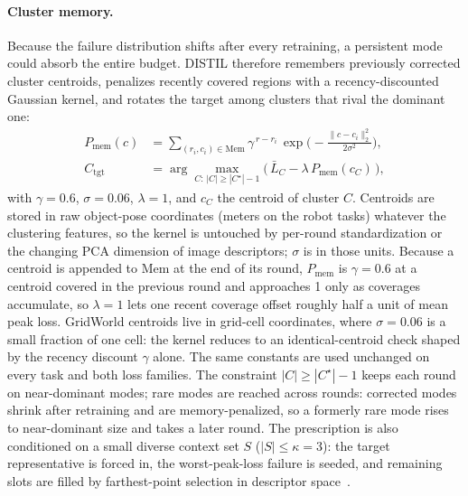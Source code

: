 \documentclass[letterpaper]{article} %
\begin{document}
\paragraph{Cluster memory.}
Because the failure distribution shifts after every retraining, a persistent
mode could absorb the entire budget. DISTIL therefore remembers previously
corrected cluster centroids, penalizes recently covered regions with a
recency-discounted Gaussian kernel, and rotates the target among clusters
that rival the dominant one:
\begin{align}
P_{\mathrm{mem}}(c)&=
\sum_{(r_i,c_i)\in\mathrm{Mem}}
\gamma^{\,r-r_i}\,
\exp\!\Big(-\tfrac{\|c-c_i\|_2^2}{2\sigma^2}\Big),
\nonumber\\
C_{\mathrm{tgt}}&=\arg\max_{C:\,|C|\ge|C^\star|-1}
\big(\,\bar L_C-\lambda\,P_{\mathrm{mem}}(c_C)\,\big),
\label{eq:memory}
\end{align}
with $\gamma{=}0.6$, $\sigma{=}0.06$, $\lambda{=}1$, and $c_C$ the centroid
of cluster $C$. Centroids are stored in raw object-pose coordinates (meters
on the robot tasks) whatever the clustering features, so the kernel is
untouched by per-round standardization or the changing PCA dimension of
image descriptors; $\sigma$ is in those units. Because a centroid is
appended to $\mathrm{Mem}$ at the end of its round, $P_{\mathrm{mem}}$ is
$\gamma=0.6$ at a centroid covered in the previous round and approaches 1
only as coverages accumulate, so $\lambda{=}1$ lets one recent coverage
offset roughly half a unit of mean peak loss. GridWorld centroids live in
grid-cell coordinates, where $\sigma{=}0.06$ is a small fraction of one
cell: the kernel reduces to an identical-centroid check shaped by the
recency discount $\gamma$ alone. The same constants are used unchanged on
every task and both loss families. The constraint
$|C|\ge|C^\star|-1$ keeps each round on near-dominant modes; rare modes are
reached across rounds: corrected modes shrink after retraining and are
memory-penalized, so a formerly rare mode rises to near-dominant size and
takes a later round. The prescription is
also conditioned on a small diverse context set $S$
($|S|\le\kappa{=}3$): the target representative is forced in, the
worst-peak-loss failure is seeded, and remaining slots are filled by
farthest-point selection in descriptor
space~\citep{sener2018coreset,eldar1997fps}.
\end{document}
